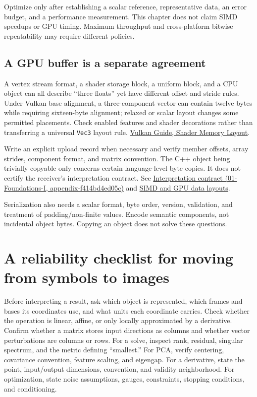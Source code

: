 Optimize only after establishing a scalar reference, representative data, an error budget, and a performance measurement. This chapter does not claim SIMD speedups or GPU timing. Maximum throughput and cross-platform bitwise repeatability may require different policies.

\subsection{A GPU buffer is a separate agreement}\label{02-foundations-ii-ch037-a-gpu-buffer-is-a-separate-agreement}

A vertex stream format, a shader storage block, a uniform block, and a CPU object can all describe ``three floats'' yet have different offset and stride rules. Under Vulkan base alignment, a three-component vector can contain twelve bytes while requiring sixteen-byte alignment; relaxed or scalar layout changes some permitted placements. Check enabled features and shader decorations rather than transferring a universal \texttt{Vec3} layout rule. \href{https://docs.vulkan.org/guide/latest/shader_memory_layout.html}{Vulkan Guide, Shader Memory Layout}.

Write an explicit upload record when necessary and verify member offsets, array strides, component format, and matrix convention. The C++ object being trivially copyable only concerns certain language-level byte copies. It does not certify the receiver's interpretation contract. See \href{../01-Foundations-I/main.pdf\#nameddest=appendix-f414bd4ed05c}{Interpretation contract (01-Foundations-I, appendix-f414bd4ed05c)} and \hyperref[appendix-3c7b1a56de01]{SIMD and GPU data layouts}.

Serialization also needs a scalar format, byte order, version, validation, and treatment of padding/non-finite values. Encode semantic components, not incidental object bytes. Copying an object does not solve these questions.

\section{A reliability checklist for moving from symbols to images}\label{02-foundations-ii-ch037-a-reliability-checklist-for-moving-from-symbols-to-images}

Before interpreting a result, ask which object is represented, which frames and bases its coordinates use, and what units each coordinate carries. Check whether the operation is linear, affine, or only locally approximated by a derivative. Confirm whether a matrix stores input directions as columns and whether vector perturbations are columns or rows. For a solve, inspect rank, residual, singular spectrum, and the metric defining ``smallest.'' For PCA, verify centering, covariance convention, feature scaling, and eigengap. For a derivative, state the point, input/output dimensions, convention, and validity neighborhood. For optimization, state noise assumptions, gauges, constraints, stopping conditions, and conditioning.

